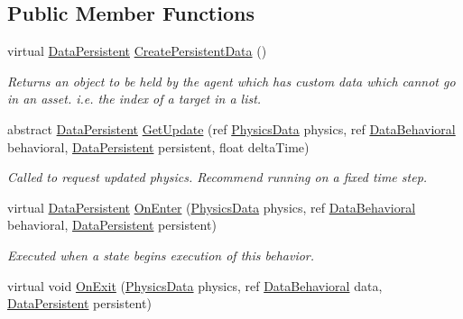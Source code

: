 \subsection*{Public Member Functions}
\begin{DoxyCompactItemize}
\item 
virtual \hyperlink{class_skyrates_1_1_a_i_1_1_behavior_1_1_data_persistent}{Data\-Persistent} \hyperlink{class_skyrates_1_1_a_i_1_1_behavior_aab005f802c87e21316ee3bb2b3be2d41}{Create\-Persistent\-Data} ()
\begin{DoxyCompactList}\small\item\em Returns an object to be held by the agent which has custom data which cannot go in an asset. i.\-e. the index of a target in a list. \end{DoxyCompactList}\item 
abstract \hyperlink{class_skyrates_1_1_a_i_1_1_behavior_1_1_data_persistent}{Data\-Persistent} \hyperlink{class_skyrates_1_1_a_i_1_1_behavior_a7fa65944c064187ccd509bcef460ef99}{Get\-Update} (ref \hyperlink{class_skyrates_1_1_physics_1_1_physics_data}{Physics\-Data} physics, ref \hyperlink{class_skyrates_1_1_a_i_1_1_behavior_1_1_data_behavioral}{Data\-Behavioral} behavioral, \hyperlink{class_skyrates_1_1_a_i_1_1_behavior_1_1_data_persistent}{Data\-Persistent} persistent, float delta\-Time)
\begin{DoxyCompactList}\small\item\em Called to request updated physics. Recommend running on a fixed time step. \end{DoxyCompactList}\item 
virtual \hyperlink{class_skyrates_1_1_a_i_1_1_behavior_1_1_data_persistent}{Data\-Persistent} \hyperlink{class_skyrates_1_1_a_i_1_1_behavior_affc3cb54c9ace9954204efc90d257823}{On\-Enter} (\hyperlink{class_skyrates_1_1_physics_1_1_physics_data}{Physics\-Data} physics, ref \hyperlink{class_skyrates_1_1_a_i_1_1_behavior_1_1_data_behavioral}{Data\-Behavioral} behavioral, \hyperlink{class_skyrates_1_1_a_i_1_1_behavior_1_1_data_persistent}{Data\-Persistent} persistent)
\begin{DoxyCompactList}\small\item\em Executed when a state begins execution of this behavior. \end{DoxyCompactList}\item 
virtual void \hyperlink{class_skyrates_1_1_a_i_1_1_behavior_a4eef309cf75dd9d56b7ea7d19e7f5258}{On\-Exit} (\hyperlink{class_skyrates_1_1_physics_1_1_physics_data}{Physics\-Data} physics, ref \hyperlink{class_skyrates_1_1_a_i_1_1_behavior_1_1_data_behavioral}{Data\-Behavioral} data, \hyperlink{class_skyrates_1_1_a_i_1_1_behavior_1_1_data_persistent}{Data\-Persistent} persistent)

\end{DoxyCompactItemize}
